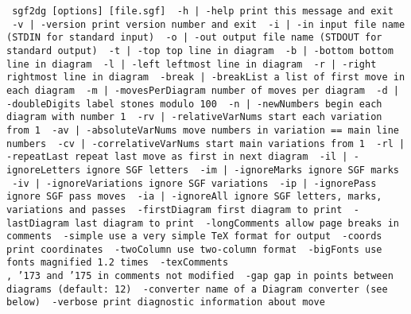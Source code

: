 \bigbreak
{\tt\parskip=0pt\parindent=5pt\obeylines\obeyspaces\hsize=400pt
\def\[{{\char'173}}
\def\]{{\char'175}}
sgf2dg [options] [file.sgf]
\medskip
\ -h | -help                print this message and exit
\ -v | -version             print version number and exit
\ -i | -in                  input file name (STDIN for standard input)
\ -o | -out                 output file name (STDOUT for standard output)
\ -t | -top                 top line in diagram
\ -b | -bottom              bottom line in diagram
\ -l | -left                leftmost line in diagram
\ -r | -right               rightmost line in diagram
\ -break | -breakList       a list of first move in each diagram
\ -m | -movesPerDiagram     number of moves per diagram
\ -d | -doubleDigits        label stones modulo 100
\ -n | -newNumbers          begin each diagram with number 1
\ -rv | -relativeVarNums    start each variation from 1
\ -av | -absoluteVarNums    move numbers in variation == main line numbers
\ -cv | -correlativeVarNums start main variations from 1 
\ -rl | -repeatLast         repeat last move as first in next diagram
\ -il | -ignoreLetters      ignore SGF letters
\ -im | -ignoreMarks        ignore SGF marks
\ -iv | -ignoreVariations   ignore SGF variations
\ -ip | -ignorePass         ignore SGF pass moves
\ -ia | -ignoreAll          ignore SGF letters, marks, variations and passes
\ -firstDiagram             first diagram to print
\ -lastDiagram              last diagram to print
\ -longComments             allow page breaks in comments
\ -simple                   use a very simple TeX format for output
\ -coords                   print coordinates
\ -twoColumn                use two-column format
\ -bigFonts                 use fonts magnified 1.2 times
\ -texComments              \\, \[ and \] in comments not modified
\ -gap                      gap in points between diagrams (default: 12)
\ -converter                name of a Diagram converter (see below)
\ -verbose                  print diagnostic information about move

\medskip}
\medskip  
